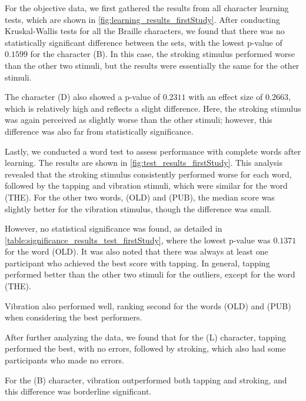 For the objective data, we first gathered the results from all character learning tests, which are shown in \autoref{fig:learning_results_firstStudy}. After conducting Kruskal-Wallis tests for all the Braille characters, we found that there was no statistically significant difference between the sets, with the lowest p-value of $0.1599$ for the character (B). In this case, the stroking stimulus performed worse than the other two stimuli, but the results were essentially the same for the other stimuli.

The character (D) also showed a p-value of $0.2311$ with an effect size of $0.2663$, which is relatively high and reflects a slight difference. Here, the stroking stimulus was again perceived as slightly worse than the other stimuli; however, this difference was also far from statistically significance.


Lastly, we conducted a word test to assess performance with complete words after learning. The results are shown in \autoref{fig:test_results_firstStudy}. This analysis revealed that the stroking stimulus consistently performed worse for each word, followed by the tapping and vibration stimuli, which were similar for the word  (THE). For the other two words,  (OLD) and  (PUB), the median score was slightly better for the vibration stimulus, though the difference was small.

However, no statistical significance was found, as detailed in \autoref{table:significance_results_test_firstStudy}, where the lowest p-value was $0.1371$ for the word  (OLD). It was also noted that there was always at least one participant who achieved the best score with tapping. In general, tapping performed better than the other two stimuli for the outliers, except for the word  (THE).

Vibration also performed well, ranking second for the words  (OLD) and  (PUB) when considering the best performers.


After further analyzing the data, we found that for the  (L) character, tapping performed the best, with no errors, followed by stroking, which also had some participants who made no errors.

For the  (B) character, vibration outperformed both tapping and stroking, and this difference was borderline significant.

